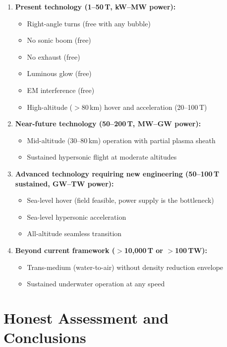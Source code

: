 \documentclass[12pt,a4paper]{article}
\begin{document}
\begin{enumerate}[label=\textbf{(\alph*)}]
\item \textbf{Present technology (1--50\,T, kW--MW power):}
  \begin{itemize}
  \item Right-angle turns (free with any bubble)
  \item No sonic boom (free)
  \item No exhaust (free)
  \item Luminous glow (free)
  \item EM interference (free)
  \item High-altitude ($>80$\,km) hover and acceleration (20--100\,T)
  \end{itemize}

\item \textbf{Near-future technology (50--200\,T, MW--GW power):}
  \begin{itemize}
  \item Mid-altitude (30--80\,km) operation with partial plasma sheath
  \item Sustained hypersonic flight at moderate altitudes
  \end{itemize}

\item \textbf{Advanced technology requiring new engineering (50--100\,T sustained,
  GW--TW power):}
  \begin{itemize}
  \item Sea-level hover (field feasible, power supply is the bottleneck)
  \item Sea-level hypersonic acceleration
  \item All-altitude seamless transition
  \end{itemize}

\item \textbf{Beyond current framework ($>$10,000\,T or $>$100\,TW):}
  \begin{itemize}
  \item Trans-medium (water-to-air) without density reduction envelope
  \item Sustained underwater operation at any speed
  \end{itemize}
\end{enumerate}


\section{Honest Assessment and Conclusions}\label{sec:conclusions}
\end{document}
